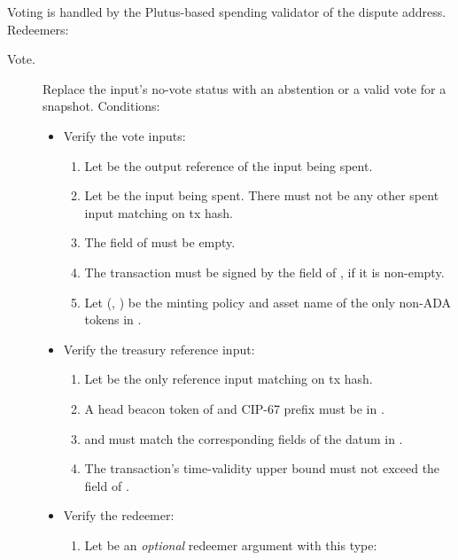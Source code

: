 \documentclass[../hydrozoa.tex]{subfiles}
\begin{document}
Voting is handled by the Plutus-based spending validator of the dispute address.
Redeemers:
\begin{description}
  \item[Vote.] Replace the input's no-vote status with an abstention or a valid vote for a snapshot. Conditions:
    \begin{itemize}
      \item Verify the vote inputs:
        \begin{enumerate}
          \item Let  be the output reference of the input being spent.
          \item Let  be the input being spent.
            There must not be any other spent input matching  on tx hash.
          \item The  field of  must be empty.
          \item The transaction must be signed by the  field of , if it is non-empty.
          \item Let (, ) be the minting policy and asset name of the only non-ADA tokens in .
        \end{enumerate}
      \item Verify the treasury reference input:
        \begin{enumerate}[resume]
          \item Let  be the only reference input matching  on tx hash.
          \item A head beacon token of  and CIP-67 prefix  must be in .
          \item {} and  must match the corresponding fields of the  datum in .
          \item The transaction's time-validity upper bound must not exceed the  field of .
        \end{enumerate}
      \item Verify the redeemer:
        \begin{enumerate}[resume]
          \item Let  be an \emph{optional} redeemer argument with this type:
            \begin{equation*}
            \begin{split}

\end{split}
\end{equation*}
\end{enumerate}
\end{itemize}
\end{description}
\end{document}
